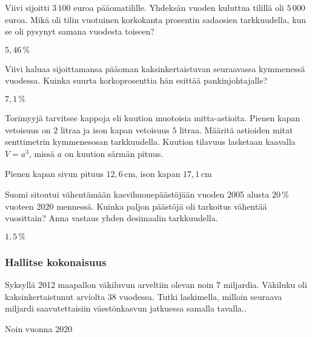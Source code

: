\begin{tehtavasivu}
\begin{tehtava}%
Viivi sijoitti $3\,100$ euroa pääomatilille. Yhdeksän vuoden kuluttua tilillä oli $5\,000$ euroa. Mikä oli tilin vuotuinen korkokanta prosentin sadaosien tarkkuudella, kun se oli pysynyt samana vuodesta toiseen? 
	\begin{vastaus}
$5,46\,\%$
	\end{vastaus}
\end{tehtava}

\begin{tehtava}%
Viivi haluaa sijoittamansa pääoman kaksinkertaistuvan seuraavassa kymmenessä vuodessa. Kuinka suurta korkoprosenttia hän esittää pankinjohtajalle?
	\begin{vastaus}
$7,1\,\%$
	\end{vastaus}
\end{tehtava}

\begin{tehtava}%
Torimyyjä tarvitsee kappoja eli kuution muotoisia mitta-astioita. Pienen kapan vetoisuus on $2$ litraa ja ison kapan vetoisuus $5$ litraa. Määritä astioiden mitat senttimetrin kymmenesosan tarkkuudella. Kuution tilavuus lasketaan kaavalla $V=a^3$, missä $a$ on kuution särmän pituus.
	\begin{vastaus}
Pienen kapan sivun pituus $12,6$\,cm, ison kapan $17,1$\,cm
	\end{vastaus}
\end{tehtava}

\begin{tehtava}%
Suomi sitoutui vähentämään kasvihuonepäästöjään vuoden 2005 alusta $20\,\%$ vuoteen 2020 mennessä. Kuinka paljon päästöjä oli tarkoitus vähentää vuosittain? Anna vastaus yhden desimaalin tarkkuudella. %
\begin{vastaus}
$1,5\,\%$
\end{vastaus}
\end{tehtava}

\subsubsection*{Hallitse kokonaisuus}
\begin{tehtava}%
Syksyllä 2012 maapallon väkiluvun arveltiin olevan noin $7$ miljardia. Väkiluku oli kaksinkertaistunut arviolta $38$ vuodessa. Tutki laskimella, milloin seuraava miljardi saavutettaisiin väestönkasvun jatkuessa samalla tavalla..
\begin{vastaus}
Noin vuonna 2020
\end{vastaus}
\end{tehtava}


\end{tehtavasivu}
